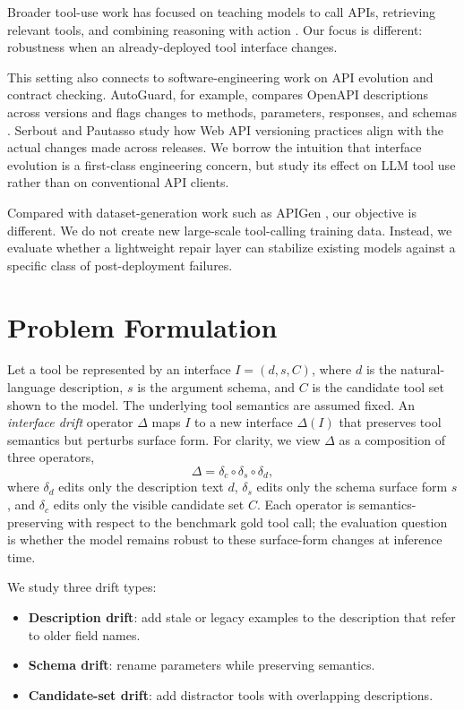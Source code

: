 \documentclass{svproc}
\begin{document}
Broader tool-use work has focused on teaching models to call APIs, retrieving
relevant tools, and combining reasoning with action
\cite{schick2023toolformer,patil2023gorilla,qin2023toolllm,yao2022react}. Our
focus is different: robustness when an already-deployed tool interface changes.

This setting also connects to software-engineering work on API evolution and
contract checking. AutoGuard, for example, compares OpenAPI descriptions across
versions and flags changes to methods, parameters, responses, and schemas
\cite{lercher2025autoguard}. Serbout and Pautasso
\cite{serbout2023versioning} study how Web API versioning practices align with the
actual changes made across releases. We borrow the intuition that interface evolution is a
first-class engineering concern, but study its effect on LLM tool use rather than
on conventional API clients.

Compared with dataset-generation work such as APIGen \cite{liu2024apigen}, our
objective is different. We do not create new large-scale tool-calling training data.
Instead, we evaluate whether a lightweight repair layer can stabilize existing models
against a specific class of post-deployment failures.

\section{Problem Formulation}
Let a tool be represented by an interface
$I = (d, s, C)$, where $d$ is the natural-language description, $s$ is the argument
schema, and $C$ is the candidate tool set shown to the model. The underlying tool
semantics are assumed fixed. An \emph{interface drift} operator $\Delta$ maps $I$ to
a new interface $\Delta(I)$ that preserves tool semantics but perturbs surface form.
For clarity, we view $\Delta$ as a composition of three operators,
\[
\Delta = \delta_c \circ \delta_s \circ \delta_d,
\]
where $\delta_d$ edits only the description text $d$, $\delta_s$ edits only the
schema surface form $s$, and $\delta_c$ edits only the visible candidate set $C$.
Each operator is semantics-preserving with respect to the benchmark gold tool call;
the evaluation question is whether the model remains robust to these surface-form
changes at inference time.

We study three drift types:
\begin{itemize}
\item \textbf{Description drift}: add stale or legacy examples to the description that
refer to older field names.
\item \textbf{Schema drift}: rename parameters while preserving semantics.
\item \textbf{Candidate-set drift}: add distractor tools with overlapping descriptions.
\end{itemize}
\end{document}
